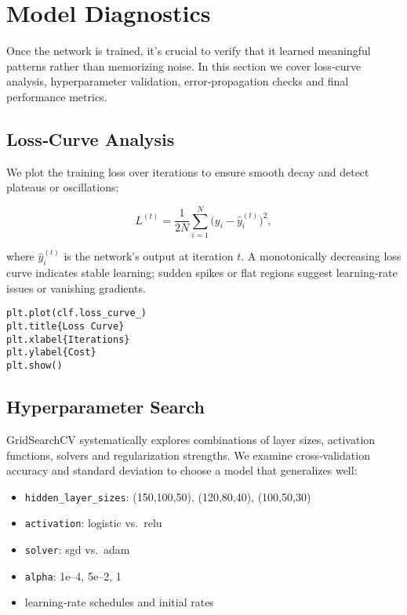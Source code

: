 \section{Model Diagnostics}

Once the network is trained, it’s crucial to verify that it learned meaningful patterns rather than memorizing noise. In this section we cover loss‐curve analysis, hyperparameter validation, error‐propagation checks and final performance metrics.

\subsection{Loss‐Curve Analysis}

We plot the training loss over iterations to ensure smooth decay and detect plateaus or oscillations:



\[
L^{(t)} = \frac{1}{2N}\sum_{i=1}^{N}\bigl(y_i - \hat y_i^{(t)}\bigr)^2,
\]


where \(\hat y_i^{(t)}\) is the network’s output at iteration \(t\). A monotonically decreasing loss curve indicates stable learning; sudden spikes or flat regions suggest learning‐rate issues or vanishing gradients.

\begin{verbatim}
plt.plot(clf.loss_curve_)
plt.title{Loss Curve}
plt.xlabel{Iterations}
plt.ylabel{Cost}
plt.show()
\end{verbatim}

\subsection{Hyperparameter Search}

GridSearchCV systematically explores combinations of layer sizes, activation functions, solvers and regularization strengths. We examine cross‐validation accuracy and standard deviation to choose a model that generalizes well:

\begin{itemize}
  \item \texttt{hidden\_layer\_sizes}: (150,100,50), (120,80,40), (100,50,30)
  \item \texttt{activation}: logistic vs.\ relu
  \item \texttt{solver}: sgd vs.\ adam
  \item \texttt{alpha}: 1e–4, 5e–2, 1
  \item learning‐rate schedules and initial rates
\end{itemize}

